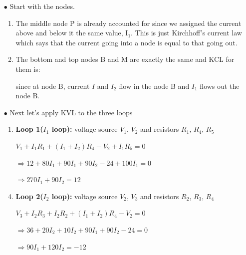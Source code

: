 \documentclass[a4 paper]{article}
\numberwithin{equation}{section}
\newcommand{\0}{\mathbf{0}}
\begin{document}
\begin{itemize} \itemsep2pt \parskip0pt 
  \item[$\bullet$] Start with the nodes.
  \begin{enumerate} \itemsep2pt \parskip0pt 
  \item The middle node P is already accounted for since we assigned the current above and below it the same value, I$_1$.  This is just Kirchhoff's current law which says that the current going into a node is equal to that going out. 
  \item The bottom and top nodes B and M are exactly the same and KCL for them is:
  \item[] \hspace{6 cm}{$I - I_1 + I_2 = 0$}\newline
  since at node B, current $I$ and $I_2$ flow in the node B and $I_1$ flows out the node B.
  \end{enumerate}
  \item[$\bullet$] Next let's apply KVL to the three loops
  \begin{enumerate} \itemsep1pt \parskip0pt 
    \item {\bf Loop 1($I_1$ loop):} voltage source $V_1$, $V_2$ and resistors $R_1$, $R_4$, $R_5$ \newline\newline
    \centerline{$V_1 + I_1R_1 + (I_1+I_2)R_4 - V_2 + I_1R_5 = 0$}\newline
    \item[] \hspace{56 mm}$\Rightarrow 12 + 80I_1 + 90I_1 + 90I_2 - 24 + 100I_1 = 0$
    \newline
    \item[] \hspace{56 mm}$\Rightarrow 270I_1 + 90I_2 = 12$
    \newline

    \item {\bf Loop 2($I_2$ loop):} voltage source $V_2$, $V_3$ and resistors $R_2$, $R_3$, $R_4$ \newline\newline
    \centerline{$V_3 + I_2R_3 + I_2R_2 + (I_1 + I_2)R_4 -V_2 = 0$}
    \newline
    \item[] \hspace{56 mm}$\Rightarrow 36 + 20I_2 + 10I_2 + 90I_1 + 90I_2- 24 = 0$ \newline
    \item[] \hspace{56 mm}$\Rightarrow 90I_1 + 120I_2 = -12$
    \newline
  

\end{enumerate}
\end{itemize}
\end{document}
